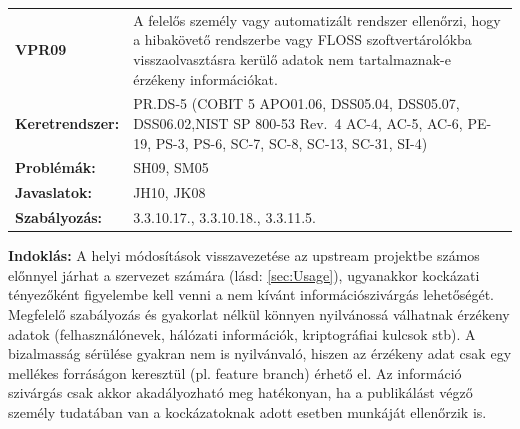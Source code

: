 \documentclass[12pt,magyar,a4paper,oneside]{scrreprt}
\begin{document}
\begin{longtable}[]{@{}ll@{}}
\toprule
\endhead
\begin{minipage}[t]{0.16\columnwidth}\raggedright
\textbf{VPR09}\strut
\end{minipage} & \begin{minipage}[t]{0.79\columnwidth}\raggedright
A felelős személy vagy automatizált rendszer ellenőrzi, hogy a
hibakövető rendszerbe vagy FLOSS szoftvertárolókba visszaolvasztásra
kerülő adatok nem tartalmaznak-e érzékeny információkat.\strut
\end{minipage}\tabularnewline
\begin{minipage}[t]{0.16\columnwidth}\raggedright
\textbf{Keretrendszer:}\strut
\end{minipage} & \begin{minipage}[t]{0.79\columnwidth}\raggedright
PR.DS-5 (COBIT 5 APO01.06, DSS05.04, DSS05.07, DSS06.02,NIST SP 800-53
Rev.~4 AC-4, AC-5, AC-6, PE-19, PS-3, PS-6, SC-7, SC-8, SC-13, SC-31,
SI-4)\strut
\end{minipage}\tabularnewline
\begin{minipage}[t]{0.16\columnwidth}\raggedright
\textbf{Problémák:}\strut
\end{minipage} & \begin{minipage}[t]{0.79\columnwidth}\raggedright
SH09, SM05\strut
\end{minipage}\tabularnewline
\begin{minipage}[t]{0.16\columnwidth}\raggedright
\textbf{Javaslatok:}\strut
\end{minipage} & \begin{minipage}[t]{0.79\columnwidth}\raggedright
JH10, JK08\strut
\end{minipage}\tabularnewline
\begin{minipage}[t]{0.16\columnwidth}\raggedright
\textbf{Szabályozás:}\strut
\end{minipage} & \begin{minipage}[t]{0.79\columnwidth}\raggedright
3.3.10.17., 3.3.10.18., 3.3.11.5.\strut
\end{minipage}\tabularnewline
\bottomrule
\end{longtable}

\textbf{Indoklás: } A helyi módosítások visszavezetése az upstream
projektbe számos előnnyel járhat a szervezet számára (lásd:
\ref{sec:Usage}), ugyanakkor kockázati tényezőként figyelembe kell venni
a nem kívánt információszivárgás lehetőségét. Megfelelő szabályozás és
gyakorlat nélkül könnyen nyilvánossá válhatnak érzékeny adatok
(felhasználónevek, hálózati információk, kriptográfiai kulcsok stb). A
bizalmasság sérülése gyakran nem is nyilvánvaló, hiszen az érzékeny adat
csak egy mellékes forráságon keresztül (pl. feature branch) érhető el.
Az információ szivárgás csak akkor akadályozható meg hatékonyan, ha a
publikálást végző személy tudatában van a kockázatoknak adott esetben
munkáját ellenőrzik is.
\end{document}
